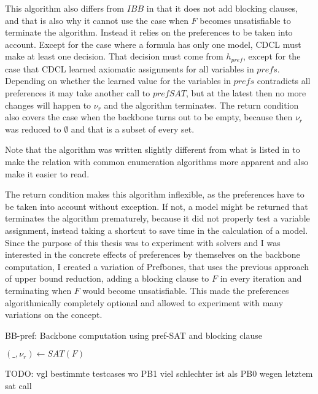 This algorithm also differs from $IBB$ in that it does not add blocking clauses, and that is also why it cannot use the case when $F$ becomes unsatisfiable to terminate the algorithm. Instead it relies on the preferences to be taken into account. Except for the case where a formula has only one model, CDCL must make at least one decision. That decision must come from $h_{pref}$, except for the case that CDCL learned axiomatic assignments for all variables in $prefs$. Depending on whether the learned value for the variables in $prefs$ contradicts all preferences it may take another call to $prefSAT$, but at the latest then no more changes will happen to $\nu_r$ and the algorithm terminates. The return condition also covers the case when the backbone turns out to be empty, because then $\nu_r$ was reduced to $\emptyset$ and that is a subset of every set.

Note that the algorithm was written slightly different from what is listed in \cite{PJ18} to make the relation with common enumeration algorithms more apparent and also make it easier to read.

The return condition makes this algorithm inflexible, as the preferences have to be taken into account without exception. If not, a model might be returned that terminates the algorithm prematurely, because it did not properly test a variable assignment, instead taking a shortcut to save time in the calculation of a model. Since the purpose of this thesis was to experiment with solvers and I was interested in the concrete effects of preferences by themselves on the backbone computation, I created a variation of Prefbones, that uses the previous approach of upper bound reduction, adding a blocking clause to $F$ in every iteration and terminating when $F$ would become unsatisfiable. This made the preferences algorithmically completely optional and allowed to experiment with many variations on the concept.

\begin{algorithm}
\caption{{\sc BB-pref: Backbone computation using pref-SAT and blocking clause}}
\label{alg:blockPref}
\DontPrintSemicolon
{}

$(\_,\nu_r) \gets SAT(F)$\;

\end{algorithm}


TODO: vgl bestimmte testcases wo PB1 viel schlechter ist als PB0 wegen letztem sat call